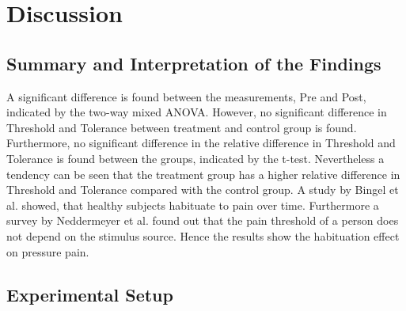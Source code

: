 \section{Discussion}

\subsection{Summary and Interpretation of the Findings}

A significant difference is found between the measurements, Pre and Post, indicated by the two-way mixed ANOVA. However, no significant
difference in Threshold and Tolerance between treatment and control group is found. Furthermore, no significant difference in the relative difference in Threshold and Tolerance is found between the groups, indicated by the t-test. Nevertheless a tendency can be seen that the treatment group has a higher relative difference in Threshold and Tolerance compared with the control group. A study by Bingel et al. \cite{Bingel2007} showed, that healthy subjects habituate to pain over time.  Furthermore a survey by Neddermeyer et al. \cite{Neddermeyer2007} found out that the pain threshold of a person does not depend on the stimulus source. Hence the results show the habituation effect on pressure pain.

\subsection{Experimental Setup}

